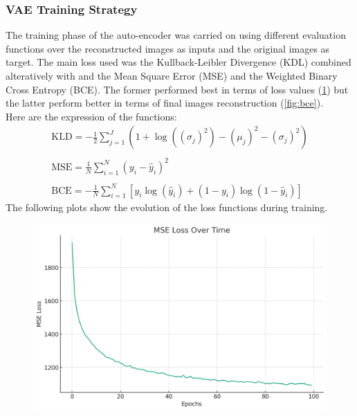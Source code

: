 \documentclass[10pt,a4paper]{article}
\begin{document}
\subsubsection{VAE Training Strategy}
The training phase of the auto-encoder was carried on using different evaluation functions over the reconstructed images as inputs and the original images as target. The main loss used was the Kullback-Leibler Divergence (KDL) combined alteratively  with and the Mean Square Error (MSE) and the Weighted Binary Cross Entropy (BCE). The former performed best in terms of loss values (\ref{fig:mse}) but the latter perform better in terms of final images reconstruction (\ref{fig:bce}).\\
Here are the expression of the functions:
\begin{gather}
    \text{KLD} = -\frac{1}{2} \sum_{j=1}^J (1 + \log((\sigma_j)^2) - (\mu_j)^2 - (\sigma_j)^2) \\
    \\
    \text{MSE} = \frac{1}{N} \sum_{i=1}^N (y_i - \hat{y}_i)^2 \\
    \\
    \text{BCE} = -\frac{1}{N} \sum_{i=1}^N [y_i \log(\hat{y}_i) + (1 - y_i) \log(1 - \hat{y}_i)]
\end{gather}
\newpage
\noindent The following plots show the evolution of the loss functions during training.
\begin{figure}[h!]
    \centering
    \includegraphics[width=1\textwidth]{./images/mse_loss.png}
    \caption{}
    \label{fig:mse}
\end{figure}
\end{document}
